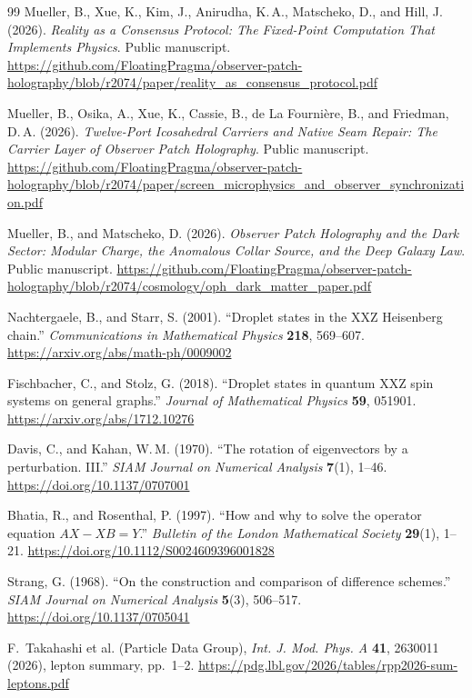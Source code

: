 \documentclass[11pt]{article}
\theoremstyle{definition}
\theoremstyle{remark}
\theoremstyle{plain}
\begin{document}
{\begin{thebibliography}{99}
Mueller, B., Xue, K., Kim, J., Anirudha, K.\,A., Matscheko, D., and Hill, J.
(2026). \emph{Reality as a Consensus Protocol: The Fixed-Point Computation
That Implements Physics}. Public manuscript.
\url{https://github.com/FloatingPragma/observer-patch-holography/blob/r2074/paper/reality_as_consensus_protocol.pdf}

Mueller, B., Osika, A., Xue, K., Cassie, B., de La Fourni\`ere, B., and Friedman, D.\,A. (2026).
\emph{Twelve-Port Icosahedral Carriers and Native Seam Repair: The Carrier Layer of Observer Patch Holography}. Public manuscript.
\url{https://github.com/FloatingPragma/observer-patch-holography/blob/r2074/paper/screen_microphysics_and_observer_synchronization.pdf}

Mueller, B., and Matscheko, D. (2026). \emph{Observer Patch Holography and the
Dark Sector: Modular Charge, the Anomalous Collar Source, and the Deep Galaxy
Law}. Public manuscript.
\url{https://github.com/FloatingPragma/observer-patch-holography/blob/r2074/cosmology/oph_dark_matter_paper.pdf}

Nachtergaele, B., and Starr, S. (2001). ``Droplet states in the XXZ
Heisenberg chain.'' \emph{Communications in Mathematical Physics}
\textbf{218}, 569--607. \url{https://arxiv.org/abs/math-ph/0009002}

Fischbacher, C., and Stolz, G. (2018). ``Droplet states in quantum XXZ spin
systems on general graphs.'' \emph{Journal of Mathematical Physics}
\textbf{59}, 051901. \url{https://arxiv.org/abs/1712.10276}

Davis, C., and Kahan, W.\,M. (1970). ``The rotation of eigenvectors by a
perturbation. III.'' \emph{SIAM Journal on Numerical Analysis} \textbf{7}(1),
1--46. \url{https://doi.org/10.1137/0707001}

Bhatia, R., and Rosenthal, P. (1997). ``How and why to solve the operator
equation $AX-XB=Y$.'' \emph{Bulletin of the London Mathematical Society}
\textbf{29}(1), 1--21. \url{https://doi.org/10.1112/S0024609396001828}

Strang, G. (1968). ``On the construction and comparison of difference
schemes.'' \emph{SIAM Journal on Numerical Analysis} \textbf{5}(3), 506--517.
\url{https://doi.org/10.1137/0705041}

F.~Takahashi et al. (Particle Data Group), \emph{Int. J. Mod. Phys. A}
\textbf{41}, 2630011 (2026), lepton summary, pp.~1--2.
\url{https://pdg.lbl.gov/2026/tables/rpp2026-sum-leptons.pdf}


\end{thebibliography}}
\end{document}
